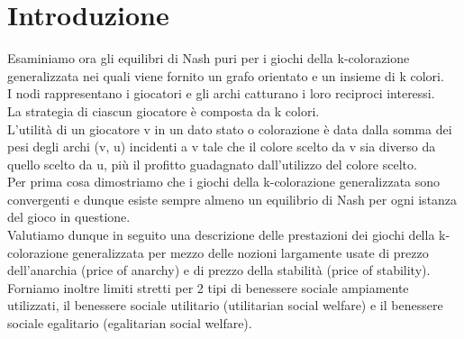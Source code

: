 \chapter{Introduzione}
\justify
Esaminiamo ora gli equilibri di Nash puri per i giochi della k-colorazione generalizzata nei quali viene fornito un grafo orientato e un insieme di k colori.\\
I nodi rappresentano i giocatori e gli archi catturano i loro reciproci interessi.\\
La strategia di ciascun giocatore è composta da k colori.\\
L'utilità di un giocatore v in un dato stato o colorazione è data dalla somma dei pesi degli archi (v, u) incidenti a v tale che il colore scelto da v sia diverso da quello scelto da u, più il profitto guadagnato dall'utilizzo del colore scelto.\\
Per prima cosa dimostriamo che i giochi della k-colorazione generalizzata sono convergenti e dunque esiste sempre almeno un equilibrio di Nash per ogni istanza del gioco in questione.\\
Valutiamo dunque in seguito una descrizione delle prestazioni dei giochi della k-colorazione generalizzata per mezzo delle nozioni largamente usate di prezzo dell'anarchia (price of anarchy) e di prezzo della stabilità (price of stability).\\
Forniamo inoltre limiti stretti per 2 tipi di benessere sociale ampiamente utilizzati, il benessere sociale utilitario (utilitarian social welfare) e il benessere sociale egalitario (egalitarian social welfare).\newline

